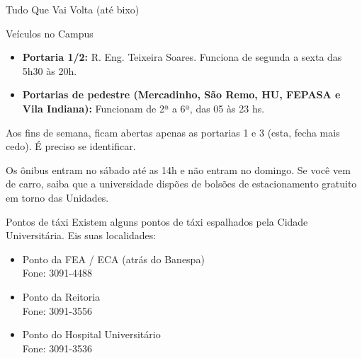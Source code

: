 \begin{secao}{Tudo Que Vai Volta (até bixo)}
\begin{subsecao}{Veículos no Campus}
\begin{itemize}
  \item {\bf Portaria 1/2:} R. Eng. Teixeira Soares. Funciona de segunda a sexta das 5h30 às 20h.

  \item {\bf Portarias de pedestre (Mercadinho, São Remo, HU, FEPASA e
      Vila Indiana):} Funcionam de 2ª a 6ª, das 05 às 23 hs.

\end{itemize}

Aos fins de semana, ficam abertas apenas as portarias 1 e 3 (esta, fecha mais cedo). É preciso se identificar.

Os ônibus entram no sábado até as 14h e não entram no domingo. Se você vem de carro, saiba que a universidade dispões de bolsões de estacionamento
gratuito em torno das Unidades.

\end{subsecao}

\begin{subsecao}{Pontos de táxi}
Existem alguns pontos de táxi espalhados pela Cidade Universitária. Eis suas
localidades:

\begin{itemize}
\item Ponto da FEA / ECA (atrás do Banespa)\\
Fone: 3091-4488

\item Ponto da Reitoria\\
Fone: 3091-3556

\item Ponto do Hospital Universitário\\
Fone: 3091-3536
\end{itemize}
\end{subsecao}

\end{secao}

